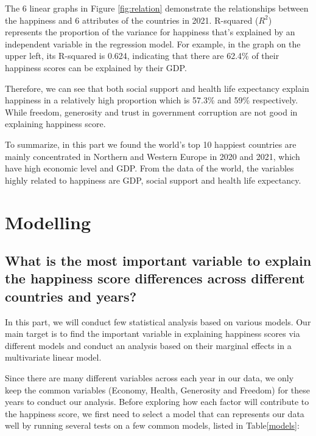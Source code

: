 \documentclass[11pt,a4paper,]{article}
\begin{document}
The 6 linear graphs in Figure \ref{fig:relation} demonstrate the relationships between the happiness and 6 attributes of the countries in 2021. R-squared (\(R^2\)) represents the proportion of the variance for happiness that's explained by an independent variable in the regression model. For example, in the graph on the upper left, its R-squared is 0.624, indicating that there are 62.4\% of their happiness scores can be explained by their GDP.

Therefore, we can see that both social support and health life expectancy explain happiness in a relatively high proportion which is 57.3\% and 59\% respectively. While freedom, generosity and trust in government corruption are not good in explaining happiness score.

To summarize, in this part we found the world's top 10 happiest countries are mainly concentrated in Northern and Western Europe in 2020 and 2021, which have high economic level and GDP. From the data of the world, the variables highly related to happiness are GDP, social support and health life expectancy.

\clearpage

\hypertarget{modelling}{%
\section{Modelling}\label{modelling}}

\hypertarget{what-is-the-most-important-variable-to-explain-the-happiness-score-differences-across-different-countries-and-years}{%
\subsection{What is the most important variable to explain the happiness score differences across different countries and years?}\label{what-is-the-most-important-variable-to-explain-the-happiness-score-differences-across-different-countries-and-years}}

In this part, we will conduct few statistical analysis based on various models. Our main target is to find the important variable in explaining happiness scores via different models and conduct an analysis based on their marginal effects in a multivariate linear model.

Since there are many different variables across each year in our data, we only keep the common variables (Economy, Health, Generosity and Freedom) for these years to conduct our analysis. Before exploring how each factor will contribute to the happiness score, we first need to select a model that can represents our data well by running several tests on a few common models, listed in Table\ref{models}:
\end{document}
